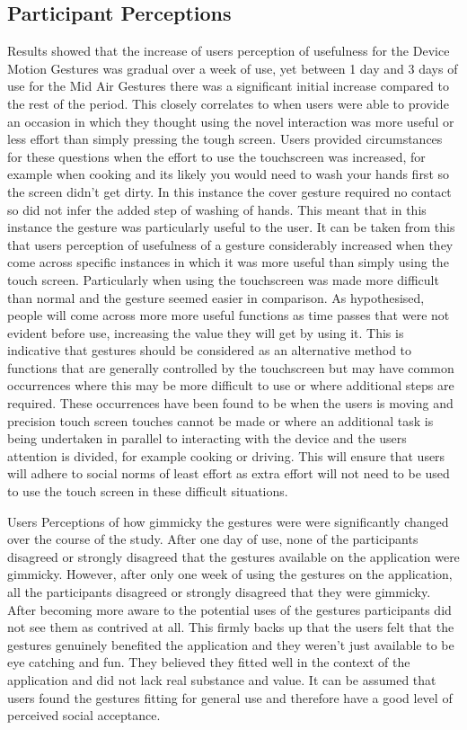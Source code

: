 \documentclass{l4proj}
\begin{document}
  
\subsection{Participant Perceptions}

Results showed that the increase of users perception of usefulness for the Device Motion Gestures was gradual over a week of use, yet between 1 day and 3 days of use for the Mid Air Gestures there was a significant initial increase compared to the rest of the period. This closely correlates to when users were able to provide an occasion in which they thought using the novel interaction was more useful or less effort than simply pressing the tough screen. Users provided circumstances for these questions when the effort to use the touchscreen was increased, for example when cooking and its likely you would need to wash your hands first so the screen didn't get dirty. In this instance the cover gesture required no contact so did not infer the added step of washing of hands. This meant that in this instance the gesture was particularly useful to the user. It can be taken from this that users perception of usefulness of a gesture considerably increased when they come across specific instances in which it was more useful than simply using the touch screen. Particularly when using the touchscreen was made more difficult than normal and the gesture seemed easier in comparison. As hypothesised, people will come across more more useful functions as time passes that were not evident before use, increasing the value they will get by using it. This is indicative that gestures should be considered as an alternative method to functions that are generally controlled by the touchscreen but may have common occurrences where this may be more difficult to use or where additional steps are required. These occurrences have been found to be when the users is moving and precision touch screen touches cannot be made or where an additional task is being undertaken in parallel to interacting with the device and the users attention is divided, for example cooking or driving. This will ensure that users will adhere to social norms of least effort as extra effort will not need to be used to use the touch screen in these difficult situations.

Users Perceptions of how gimmicky the gestures were were significantly changed over the course of the study. After one day of use, none of the participants disagreed or strongly disagreed that the gestures available on the application were gimmicky. However, after only one week of using the gestures on the application, all the participants disagreed or strongly disagreed that they were gimmicky. After becoming more aware to the potential uses of the gestures participants did not see them as contrived at all. This firmly backs up that the users felt that the gestures genuinely benefited the application and they weren't just available to be eye catching and fun. They believed they fitted well in the context of the application and did not lack real substance and value. It can be assumed that users found the gestures fitting for general use and therefore have a good level of perceived social acceptance.
\end{document}
